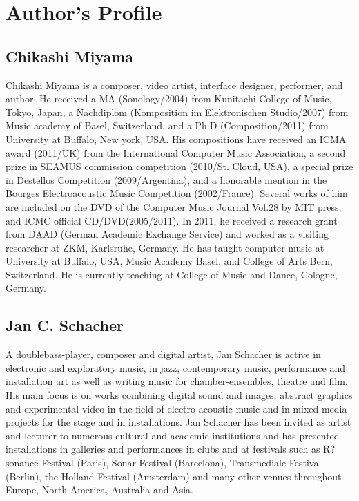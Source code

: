 \documentclass[a4paper]{article}
\begin{document}
\printbibliography


\section{Author's Profile}
\subsection*{Chikashi Miyama}
Chikashi Miyama is a composer, video artist, interface designer, performer, and author. He received a MA (Sonology/2004) from Kunitachi College of Music, Tokyo, Japan, a Nachdiplom (Komposition im Elektronischen Studio/2007) from Music academy of Basel, Switzerland, and a Ph.D (Composition/2011) from University at Buffalo, New york, USA. His compositions have received an ICMA award (2011/UK) from the International Computer Music Association, a second prize in SEAMUS commission competition (2010/St. Cloud, USA), a special prize in Destellos Competition (2009/Argentina), and a honorable mention in the Bourges Electroacoustic Music Competition (2002/France). Several works of him are included on the DVD of the Computer Music Journal Vol.28 by MIT press, and ICMC official CD/DVD(2005/2011). In 2011, he received a research grant from DAAD (German Academic Exchange Service) and worked as a visiting researcher at ZKM, Karlsruhe, Germany. He has taught computer music at  University at Buffalo, USA,  Music Academy Basel, and College of Arts Bern, Switzerland. He is currently teaching at College of Music and Dance, Cologne, Germany. 

\subsection*{Jan C. Schacher}
A doublebass-player, composer and digital artist, Jan Schacher is active in electronic and exploratory music, in jazz, contemporary music, performance and installation art as well as writing music for chamber-ensembles, theatre and film. His main focus is on works combining digital sound and images, abstract graphics and experimental video in the field of electro-acoustic music and in mixed-media projects for the stage and in installations. Jan Schacher has been invited as artist and lecturer to numerous cultural and academic institutions and has presented installations in galleries and performances in clubs and at festivals such as R?sonance Festival (Paris), Sonar Festival (Barcelona), Transmediale Festival (Berlin), the Holland Festival (Amsterdam) and many other venues throughout Europe, North America, Australia and Asia.
\end{document}
